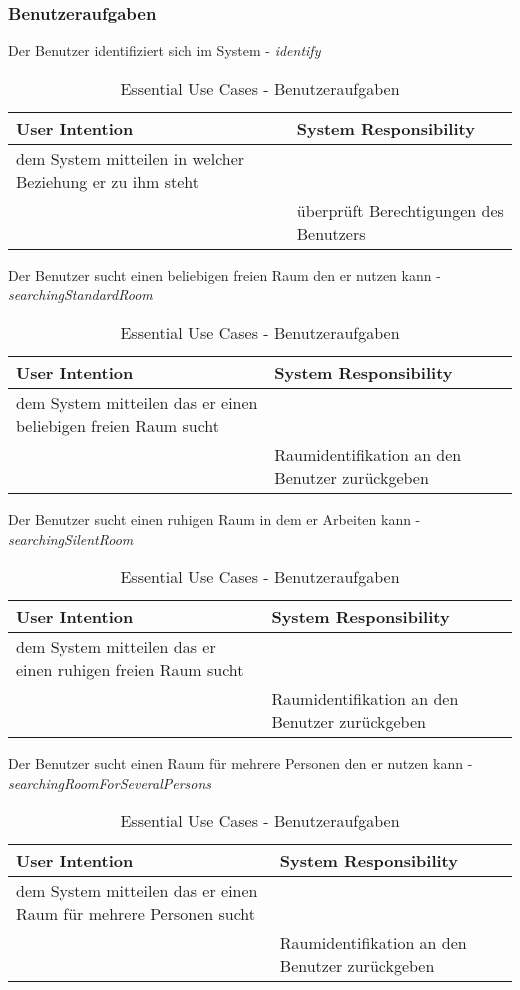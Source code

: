 \subsubsection{Benutzeraufgaben}
\begin{table}[h]
	\caption{Essential Use Cases - Benutzeraufgaben}
	
	Der Benutzer identifiziert sich im System - \textit{identify}\\
	\begin{tabularx}{\textwidth}{|X|X|}
	\rowcolor{heading} \textbf{User Intention} & \textbf{System Responsibility}\\ \hline
	dem System mitteilen in welcher Beziehung er zu ihm steht & \\
	 & überprüft Berechtigungen des Benutzers \\ \hline
	\end{tabularx}

	Der Benutzer sucht einen beliebigen freien Raum den er nutzen kann - \textit{searchingStandardRoom}\\
	\begin{tabularx}{\textwidth}{|X|X|}
	\rowcolor{heading} \textbf{User Intention} & \textbf{System Responsibility}\\ \hline
	dem System mitteilen das er einen beliebigen freien Raum sucht & \\
	 & Raumidentifikation an den Benutzer zurückgeben \\ \hline
	\end{tabularx}

	Der Benutzer sucht einen ruhigen Raum in dem er Arbeiten kann - \textit{searchingSilentRoom}\\
	\begin{tabularx}{\textwidth}{|X|X|}
	\rowcolor{heading} \textbf{User Intention} & \textbf{System Responsibility}\\ \hline
	dem System mitteilen das er einen ruhigen freien Raum sucht & \\
	 & Raumidentifikation an den Benutzer zurückgeben \\ \hline
	\end{tabularx}
	
	Der Benutzer sucht einen Raum für mehrere Personen den er nutzen kann - \textit{searchingRoomForSeveralPersons}\\
	\begin{tabularx}{\textwidth}{|X|X|}
	\rowcolor{heading} \textbf{User Intention} & \textbf{System Responsibility}\\ \hline
	dem System mitteilen das er einen Raum für mehrere Personen sucht & \\
	 & Raumidentifikation an den Benutzer zurückgeben \\ \hline
	\end{tabularx}
	

\end{table}
